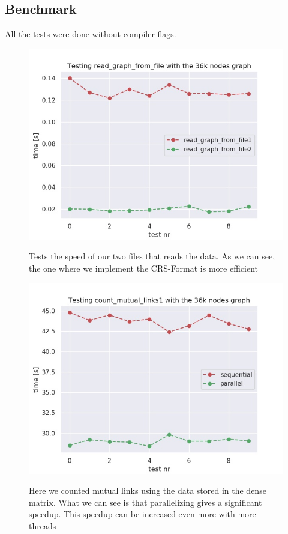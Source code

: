 \documentclass{article}
\begin{document}
\subsection{Benchmark}
All the tests were done without compiler flags.
\begin{figure}[H]
\centering
\parbox{15cm}{
\includegraphics[width=15cm]{read_36k_graph.jpg}
\label{fig:Test 1}}
\qquad
\caption{Tests the speed of our two files that reads the data. As we can see, the one where we implement the CRS-Format is more efficient  }
\end{figure}


\begin{figure}[H]
\centering
\parbox{15cm}{
\includegraphics[width=15cm]{count_1_36k_graph.jpg}
\label{fig:Test 1}}
\qquad
\caption{Here we counted mutual links using the data stored in the dense matrix. What we can see is that parallelizing gives a significant speedup. This speedup can be increased even more with more threads}
\end{figure}
\end{document}
